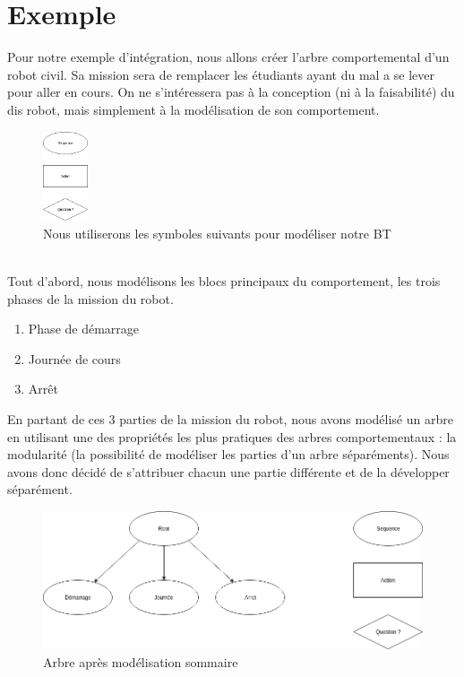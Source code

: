 \documentclass[titlepage]{article}
\begin{document}
	\section{Exemple}
	Pour notre exemple d'intégration, nous allons créer l'arbre comportemental d'un robot civil. Sa mission sera de remplacer les étudiants ayant du mal a se lever pour aller en cours. On ne s'intéressera pas à la conception (ni à la faisabilité) du dis robot, mais simplement à la modélisation de son comportement. 
	\\
	\begin{figure}[h!]
		\centering
		\includegraphics[width=50px]{img/BT_1.png}
		\caption{Nous utiliserons les symboles suivants pour modéliser notre BT}
		\label{fig:exemple_1}
	\end{figure}
	\\
	Tout d'abord, nous modélisons les blocs principaux du comportement, les trois phases de la mission du robot.
	\begin{enumerate}
		\item Phase de démarrage
		\item Journée de cours
		\item Arr\^et
	\end{enumerate}
	En partant de ces 3 parties de la mission du robot, nous avons modélisé un arbre en utilisant une des propriétés les plus pratiques des arbres comportementaux : la modularité (la possibilité de modéliser les parties d'un arbre séparéments). \cite{iliffe_andrea_marlow_rachel_phillips_alexander_petter_2018}
	Nous avons donc décidé de s'attribuer chacun une partie différente et de la développer séparément.
	\\
	\begin{figure}[h!]
		\centering
		\includegraphics[width=\linewidth]{img/BT_2.png}
		\caption{Arbre après modélisation sommaire}
		\label{fig:exemple_2}
	\end{figure}
	\\
\end{document}
